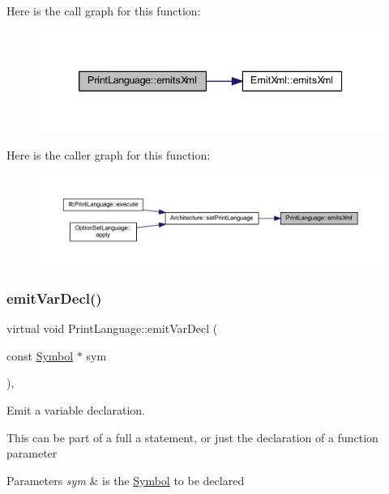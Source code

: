 Here is the call graph for this function\+:
\nopagebreak
\begin{figure}[H]
\begin{center}
\leavevmode
\includegraphics[width=339pt]{class_print_language_a3a95b637e8095b550d81cbda9b25f9b1_cgraph}
\end{center}
\end{figure}
Here is the caller graph for this function\+:
\nopagebreak
\begin{figure}[H]
\begin{center}
\leavevmode
\includegraphics[width=350pt]{class_print_language_a3a95b637e8095b550d81cbda9b25f9b1_icgraph}
\end{center}
\end{figure}
\mbox{\label{class_print_language_a2007b92c662e0261310d2bbac3bfe4f1}} 
\subsubsection{\texorpdfstring{emitVarDecl()}{emitVarDecl()}}
{\footnotesize\ttfamily virtual void Print\+Language\+::emit\+Var\+Decl (\begin{DoxyParamCaption}\item[{const \mbox{\hyperlink{class_symbol}{Symbol}} $\ast$}]{sym }\end{DoxyParamCaption})\hspace{0.3cm}{\ttfamily [protected]}, {}}



Emit a variable declaration. 

This can be part of a full a statement, or just the declaration of a function parameter 
\begin{DoxyParams}{Parameters}
{\em sym} & is the \mbox{\hyperlink{class_symbol}{Symbol}} to be declared \\
\hline
\end{DoxyParams}


